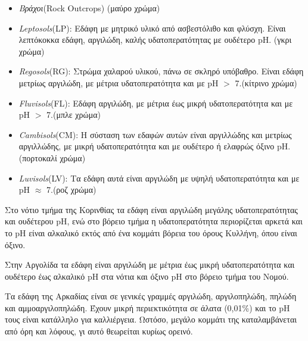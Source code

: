 \documentclass[12pt]{article}
\newcommand{\gr}{\selectlanguage{greek}}
\newcommand{\eng}{\selectlanguage{english}}
\begin{document}
	 \begin{itemize}
	 	\item \emph{Βράχοι}(Rock Outcrops) (μαύρο χρώμα)
	 	\item \emph{Leptosols}(LP): Εδάφη με μητρικό υλικό από ασβεστόλιθο και φλύσχη. Είναι λεπτόκοκκα εδάφη, αργιλώδη, καλής υδατοπερατότητας με ουδέτερο pH. (γκρι χρώμα)
	 	\item \emph{Regosols}(RG): Στρώμα χαλαρού υλικού, πάνω σε σκληρό υπόβαθρο. Είναι εδάφη μετρίως αργιλώδη, με μέτρια υδατοπερατότητα και με pH $>$ 7.(κίτρινο χρώμα)
	 	\item \emph{Fluvisols}(FL): Εδάφη αργιλώδη, με μέτρια έως μικρή υδατοπερατότητα και με pH $>$ 7.(μπλε χρώμα)
	 	\item \emph{Cambisols}(CM): Η σύσταση των εδαφών αυτών είναι αργιλλώδης και μετρίως αργιλλώδης, με μικρή υδατοπερατότητα και με ουδέτερο ή ελαφρώς όξινο pH. (πορτοκαλί χρώμα)
	 	\item \emph{Luvisols}(LV): Τα εδάφη αυτά είναι αργιλώδη με υψηλή υδατοπερατότητα και με pH $\approx$ 7.(ροζ χρώμα)
	 \end{itemize}
 
 	Στο νότιο τμήμα της Κορινθίας τα εδάφη είναι αργιλώδη μεγάλης υδατοπερατότητας και ουδέτερου pH, ενώ στο βόρειο τμήμα η υδατοπερατότητα περιορίζεται αρκετά και το pH είναι αλκαλικό εκτός από ένα κομμάτι βόρεια του όρους Κυλλήνη, όπου είναι όξινο.
 	
 	Στην Αργολίδα τα εδάφη είναι αργιλώδη με μέτρια έως μικρή υδατοπερατότητα και ουδέτερο έως αλκαλικό pH στα νότια και όξινο pH στο βόρειο τμήμα του Νομού.
 	
 	Τα εδάφη της Αρκαδίας είναι σε γενικές γραμμές αργιλώδη, αργιλοπηλώδη, πηλώδη και αμμοαργιλοπηλώδη. Έχουν μικρή περιεκτικότητα σε άλατα (0,01\%) και το \eng pH \gr τους είναι κατάλληλο για καλλιέργεια. Ωστόσο, μεγάλο κομμάτι της καταλαμβάνεται από όρη και λόφους, γι αυτό θεωρείται κυρίως ορεινό. 
 	
\end{document}
